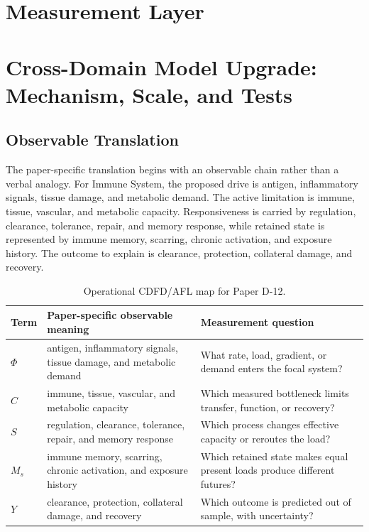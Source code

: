 \documentclass[11pt,a4paper]{article}
\begin{document}
\section{Measurement Layer}

\section{Cross-Domain Model Upgrade: Mechanism, Scale, and Tests}

\subsection{Observable Translation}

The paper-specific translation begins with an observable chain rather than a
verbal analogy. For Immune System, the proposed drive is antigen, inflammatory signals, tissue damage, and metabolic demand.
The active limitation is immune, tissue, vascular, and metabolic capacity. Responsiveness is carried by
regulation, clearance, tolerance, repair, and memory response, while retained state is represented by
immune memory, scarring, chronic activation, and exposure history. The outcome to explain is clearance, protection, collateral damage, and recovery.

\begin{table}[htbp]
\centering
\small
\caption{Operational CDFD/AFL map for Paper D-12.}
\begin{tabularx}{\textwidth}{|l|X|X|}
\hline
\textbf{Term} & \textbf{Paper-specific observable meaning} & \textbf{Measurement question} \\
\hline
$\Phi$ & antigen, inflammatory signals, tissue damage, and metabolic demand & What rate, load, gradient, or demand enters the focal system? \\
\hline
$C$ & immune, tissue, vascular, and metabolic capacity & Which measured bottleneck limits transfer, function, or recovery? \\
\hline
$S$ & regulation, clearance, tolerance, repair, and memory response & Which process changes effective capacity or reroutes the load? \\
\hline
$M_s$ & immune memory, scarring, chronic activation, and exposure history & Which retained state makes equal present loads produce different futures? \\
\hline
$Y$ & clearance, protection, collateral damage, and recovery & Which outcome is predicted out of sample, with uncertainty? \\
\hline
\end{tabularx}
\end{table}
\end{document}
